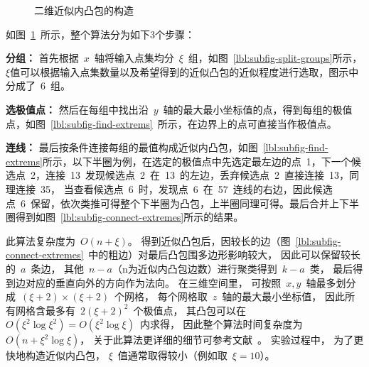 \begin{figure}[htbp]
  \centering
   \hspace{0.5cm}
  \linebreak
   \hspace{0.5cm}
  \hspace{2em}
   \hspace{0.5cm}
  \caption{二维近似内凸包的构造\cite{bentley1982approximation}}
\label{lbl:ach-2d}
\end{figure}

如图~\ref{lbl:ach-2d}~所示，整个算法分为如下3个步骤：

\begin{inparaenum}[(1)]
\item \textbf{分组：}
首先根据~$x$~轴将输入点集均分~$\xi$~组，如图~\ref{lbl:subfig-split-groups}所示，$\xi$值可以根据输入点集数量以及希望得到的近似凸包的近似程度进行选取，图示中分成了~6~组。\\
\indent \item \textbf{选极值点：}
然后在每组中找出沿~$y$~轴的最大最小坐标值的点，得到每组的极值点，如图~\ref{lbl:subfig-find-extrems}~所示，在边界上的点可直接当作极值点。\\
\indent \item \textbf{连线：}
最后按条件连接每组的最值构成近似内凸包，如图~\ref{lbl:subfig-find-extrems}所示，以下半圈为例，在选定的极值点中先选定最左边的点~1，下一个候选点~2，连接~13~发现候选点~2~在~13~的左边，丢弃候选点~2~直接连接~13，同理连接~35，
当查看候选点~6~时，发现点~6~在~57~连线的右边，因此候选点~6~保留，依次类推可得整个下半圈为凸包，上半圈同理可得。最后合并上下半圈得到如图~\ref{lbl:subfig-connect-extremes}所示的结果。
\end{inparaenum}

此算法复杂度为~$O(n+\xi)$。  
得到近似凸包后，因较长的边（图~\ref{lbl:subfig-connect-extremes}~中的粗边）对最后凸包围多边形影响较大， 因此可以保留较长的~$a$~条边， 其他~$n-a$（n为近似内凸包边数）进行聚类得到~$k-a$~类， 最后得到边对应的垂直向外的方向作为法向。
在三维空间里， 可按照~$x,y$~轴最多划分成~$(\xi+2)\times (\xi+2)$~个网格， 每个网格取~$z$~轴的最大最小坐标值， 因此所有网格含最多有~$2(\xi+2)^2$~个极值点， 其凸包可以在~$O(\xi^2\log \xi^2) = O(\xi^2\log \xi)$~内求得， 因此整个算法时间复杂度为~$O(n+\xi^2\log\xi)$， 
关于此算法更详细的细节可参考文献~。 实验过程中， 为了更快地构造近似内凸包， $\xi$~值通常取得较小（例如取~$\xi=10$）。

